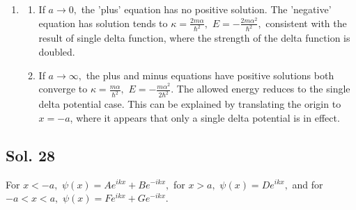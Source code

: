 \begin{enumerate}
    $$
    1-\frac{\hbar^2\kappa}{m\alpha} = \pm e^{-2a\kappa}.
    $$


    The 'minus' equation always yields a positive solution. In contrast, the 'plus' equation—aside from the zero solution—yields either a positive or negative solution depending on the values of $\alpha$ and $a$.

    

    If $\alpha = \frac{\hbar^2}{ma},$ $a\kappa_1\approx 0.8,$ 
    $E_1\approx -\frac{0.64\hbar^2}{2ma^2},$




    
    $a\kappa_2\approx 1.1,$ 
    $E_2\approx -\frac{1.21\hbar^2}{2ma^2}$
    
    


    If $\alpha = \frac{\hbar^2}{4ma},$ $a\kappa_1\approx -0.63,$ 
    $E_1$ not allowed,
    and 
    $a\kappa_2\approx 0.37,$ 
    $E_2\approx -\frac{0.14\hbar^2}{2ma^2}$
    
    
    
    \item 
    \begin{enumerate}
        \item If $a\to0,$ the 'plus' equation has no positive solution. The 'negative' equation has solution tends to 
        $\kappa=\frac{2m\alpha}{\hbar^2},$
        $E=-\frac{2m\alpha^2}{\hbar^2},$
        consistent with the result of single delta function, where the strength of the delta function is doubled.
        \item  If $a\to\infty,$ the plus and minus equations have positive solutions both converge to 
        $\kappa=\frac{m\alpha}{\hbar^2},$ 
        $E=-\frac{m\alpha^2}{2\hbar^2}.$ 
        The allowed energy reduces to the single delta potential case. This can be explained by translating the origin to $x = -a$, where it appears that only a single delta potential is in effect.
    \end{enumerate}
    
\end{enumerate}

\subsection*{Sol. 28}
For $x<-a,$ $\psi(x)=Ae^{ikx}+Be^{-ikx},$ for $x>a,$ $\psi(x)=De^{ikx},$ and for $-a<x<a,$ 
$\psi(x)=Fe^{ikx}+Ge^{-ikx}.$

